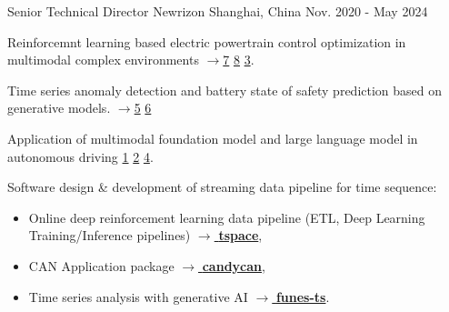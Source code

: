 \documentclass[../cv_xin.tex]{subfiles}
\begin{document}


\begin{cventries}

  \cventry
    {Senior Technical Director} %
    {Newrizon} %
    {Shanghai, China} %
    {Nov. 2020 - May 2024} %
    {
      \begin{cvitems} %
          \item Reinforcemnt learning based electric powertrain control optimization in multimodal complex environments
          \hyperlink{Xin_VEOS_22}{$\rightarrow$7} \hyperlink{Xin_Fu_Pan_Simulation_Test_RL_22}{8} \hyperlink{Pan_Xin_DrvStyle_23}{3}.
          \item Time series anomaly detection and battery state of safety prediction based on generative models. \hyperlink{Xin_GenAI_23}{$\rightarrow$5} \hyperlink{Xin_Chen_NN_TSFeatures_23}{6}
          \item Application of multimodal foundation model and large language model in autonomous driving \hyperlink{Xin_LLM_24}{1} \hyperlink{Xin_VLM_24}{2} \hyperlink{Xin_Latent_Diffusion_23}{4}.
          \item Software design \& development of streaming data pipeline for time sequence:
            \begin{itemize}
                    \item Online deep reinforcement learning data pipeline (ETL, Deep Learning Training/Inference pipelines) \href{https://binjian.github.io/tspace/}{$\rightarrow$ \textbf{tspace}},
                    \item CAN Application package \href{https://binjian.github.io/candycan/}{$\rightarrow$ \textbf{candycan}},
                    \item Time series analysis with generative AI \href{https://github.io/binjian/funes-ts/}{$\rightarrow$ \textbf{funes-ts}}.
            \end{itemize}
      \end{cvitems}
    }


\end{cventries}
\end{document}
